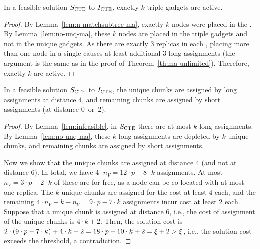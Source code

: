 \begin{lemma}
  In a feasible solution $S_{\mathrm{\textsc{CTE}}}$ to $I_{\mathrm{\textsc{CTE}}}$, exactly $k$ triple gadgets are active.
  \label{lem:n-active-ma}
\end{lemma}
\begin{proof}
  By Lemma~\ref{lem:n-matchsubtree-ma}, exactly $k$ nodes were placed in the \MatchSubtree{}.
  By Lemma~\ref{lem:no-unq-ma}, these $k$ nodes are placed in the triple gadgets and not in the unique gadgets.
As there are exactly $3$ replicas in each \TripleGadget{}, placing more than one node in a single \TripleGadget{} causes at least additional $3$ long assignments (the argument is the same as in the proof of Theorem~\ref{th:ma-unlimited}).
Therefore, exactly $k$ \TripleGadgets{} are active.
\end{proof}

\begin{lemma}
  In a feasible solution $S_{\mathrm{\textsc{CTE}}}$ to $I_{\mathrm{\textsc{CTE}}}$, the unique chunks are assigned by long assignments at distance 4, and remaining chunks are assigned by short assignments (at distance 0~or~2).
  \label{lem:short-ma}
\end{lemma}
\begin{proof}
  By Lemma~\ref{lem:infeasible}, in $S_{\mathrm{\textsc{CTE}}}$ there are at most $k$ long assignments.
  By Lemma~\ref{lem:no-unq-ma}, these $k$ long assignments are depleted by $k$ unique chunks, and remaining chunks are assigned by short assignments.


  Now we show that the unique chunks are assigned at distance $4$ (and not at distance $6$).
  In total, we have $4\cdot n_V = 12\cdot p - 8\cdot k$ assignments.
  At most $n_V = 3\cdot p - 2\cdot k$ of these are for free, as a node can be co-located with at most one replica.
  The $k$ unique chunks are assigned for the cost at least $4$ each, and the remaining $4\cdot n_V - k - n_V = 9\cdot p - 7\cdot k$ assignments incur cost at least $2$ each.
  Suppose that a unique chunk is assigned at distance $6$, i.e., the cost of assignment of the unique chunks is $4\cdot k + 2$.
  Then, the solution cost is $2\cdot(9\cdot p - 7\cdot k) + 4\cdot k + 2 = 18\cdot p - 10\cdot k + 2 = \xi + 2 > \xi$, i.e., the solution cost exceeds the threshold, a contradiction.
\end{proof}

